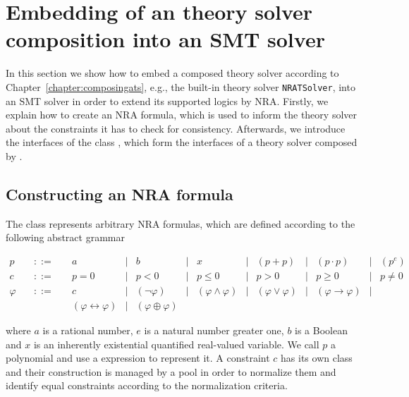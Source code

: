 \chapter{Embedding of an \smtrat theory solver composition into an SMT solver}
\label{chapter:embeddingats}
In this section we show how to embed a composed theory solver according
to Chapter~\ref{chapter:composingats}, e.g., the built-in theory 
solver \texttt{NRATSolver}, into an SMT solver in order to 
extend its supported logics by NRA. Firstly, we explain how to
create an NRA formula, which is used to inform the theory solver about the
constraints it has to check for consistency. Afterwards, we introduce the 
interfaces of the class \managerClass, which form the interfaces of
a theory solver composed by \smtrat.

\section{Constructing an NRA formula}
The class \formulaClass represents arbitrary NRA formulas, which are
defined according to the following abstract grammar

\[
\begin{array}{rccccccccccccc}
  p &\quad ::=\quad & a & | & b & | & x & | & (p + p) & | & (p \cdot p) & | & (p^e) \\
  c &\quad ::=\quad & p = 0 & | & p < 0 & | & p \leq 0 & | & p > 0 & | & p \geq 0 & | & p \neq 0 \\
 \varphi &\quad ::=\quad & c & | & (\neg \varphi) & | &
 (\varphi\land\varphi) & | &
 (\varphi\lor\varphi) & | & 
 (\varphi\rightarrow\varphi) & | \\ &&
 (\varphi\leftrightarrow\varphi) & | &
 (\varphi\oplus\varphi)
\end{array}
\]

where $a$ is a rational number, $e$ is a natural number greater one, $b$ is a Boolean  and $x$ is an inherently existential 
quantified real-valued variable. We call $p$ a polynomial and use a \ginac expression to represent it. A constraint $c$
has its own \Cpp class and their construction is managed by a pool in order to normalize them and identify
equal constraints according to the normalization criteria. 

